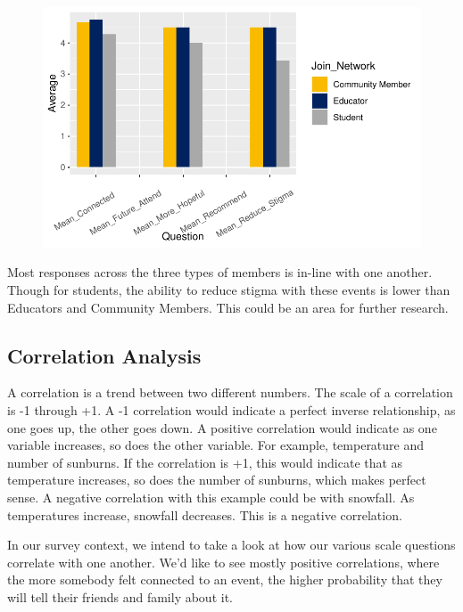 \documentclass[
  letterpaper,
  DIV=11,
  numbers=noendperiod]{scrartcl}
\begin{document}
\begin{figure}[H]

{\centering \includegraphics{ytp_post_event_survey_files/figure-pdf/unnamed-chunk-17-1.pdf}

}

\end{figure}

Most responses across the three types of members is in-line with one
another. Though for students, the ability to reduce stigma with these
events is lower than Educators and Community Members. This could be an
area for further research.

\hypertarget{correlation-analysis}{%
\subsection{Correlation Analysis}\label{correlation-analysis}}

A correlation is a trend between two different numbers. The scale of a
correlation is -1 through +1. A -1 correlation would indicate a perfect
inverse relationship, as one goes up, the other goes down. A positive
correlation would indicate as one variable increases, so does the other
variable. For example, temperature and number of sunburns. If the
correlation is +1, this would indicate that as temperature increases, so
does the number of sunburns, which makes perfect sense. A negative
correlation with this example could be with snowfall. As temperatures
increase, snowfall decreases. This is a negative correlation.

In our survey context, we intend to take a look at how our various scale
questions correlate with one another. We'd like to see mostly positive
correlations, where the more somebody felt connected to an event, the
higher probability that they will tell their friends and family about
it.
\end{document}
